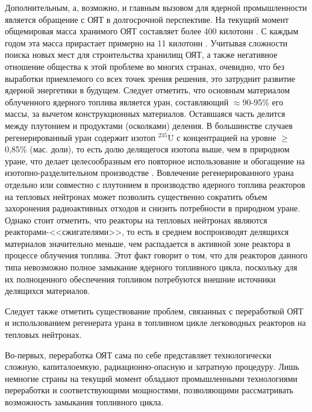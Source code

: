 Дополнительным, а, возможно, и главным вызовом для ядерной промышленности является обращение с ОЯТ в долгосрочной перспективе. На текущий момент общемировая масса хранимого ОЯТ составляет более 400 килотонн \cite{kaygorodcevProblemyPerspektivyRazvitiya2021}. С каждым годом эта масса прирастает примерно на 11 килотонн \cite{UseReprocessedUranium2019}. Учитывая сложности поиска новых мест для строительства хранилищ ОЯТ, а также негативное отношение общества к этой проблеме во многих странах, очевидно, что без выработки приемлемого со всех точек зрения решения, это затруднит развитие ядерной энергетики в будущем. 
Следует отметить, что основным материалом облученного ядерного топлива является уран, составляющий $\approx$90-95\% его массы, за вычетом конструкционных материалов. Оставшаяся часть делится между плутонием и продуктами (осколками) деления. В большинстве случаев регенерированный уран содержит изотоп $^{235}$U с концентрацией на уровне $\geq$0,85\% (мас. доли), то есть долю делящегося изотопа выше, чем в природном уране, что делает целесообразным его повторное использование и обогащение на изотопно-разделительном производстве  \cite{NikipelovNikipelovSudby}. Вовлечение регенерированного урана отдельно или совместно с плутонием в производство ядерного топлива реакторов на тепловых нейтронах может позволить существенно сократить объем захоронения радиоактивных отходов и снизить потребности в природном уране. Однако стоит отметить, что реакторы на тепловых нейтронах являются реакторами-<<сжигателями>>, то есть в среднем воспроизводят делящихся материалов значительно меньше, чем распадается в активной зоне реактора в процессе облучения топлива. Этот факт говорит о том, что для реакторов данного типа невозможно полное замыкание ядерного топливного цикла, поскольку для их полноценного обеспечения топливом потребуются внешние источники делящихся материалов.

Следует также отметить существование проблем, связанных с переработкой ОЯТ и использованием регенерата урана в топливном цикле легководных реакторов на тепловых нейтронах.

Во-первых, переработка ОЯТ сама по себе представляет технологически сложную, капиталоемкую, радиационно-опасную и затратную процедуру. Лишь немногие страны на текущий момент обладают промышленными технологиями переработки и соответствующими мощностями, позволяющими рассматривать возможность замыкания топливного цикла.


